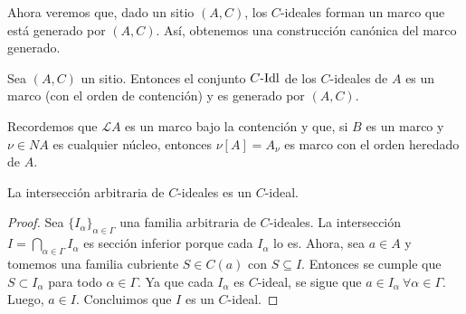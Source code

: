 Ahora veremos que, dado un sitio $(A,C)$, los $C$-ideales forman un
marco que está generado por $(A,C)$. Así, obtenemos una construcción
canónica del marco generado.

\begin{theorem}
    Sea $(A,C)$ un sitio. Entonces el conjunto $C\text{-}\mathrm{Idl}$ de los
    $C$-ideales de $A$ es un marco (con el orden de contención) y es
    generado por $(A,C)$.
\end{theorem}

Recordemos que $\mathcal{L}A$ es un marco bajo la contención
y que, si $B$ es un marco y $\nu\in NA$ es cualquier núcleo,
entonces $\nu[A]=A_\nu$ es marco con el orden heredado de $A$.

\begin{lemma}[Previo]
    La intersección arbitraria de $C$-ideales es un $C$-ideal.
\end{lemma}
\begin{proof}
    Sea $\{I_\alpha\}_{\alpha\in\Gamma}$ una familia arbitraria de
    $C$-ideales. La intersección $I=\bigcap_{\alpha\in\Gamma}I_\alpha$
    es sección inferior porque cada $I_\alpha$ lo es.
    Ahora, sea $a\in A$ y tomemos una familia cubriente $S\in C(a)$
    con $S\subseteq I$. Entonces se cumple que $S\subset I_\alpha$
    para todo $\alpha\in\Gamma$. Ya que cada $I_\alpha$ es $C$-ideal,
    se sigue que $a\in I_\alpha\ \forall\alpha\in\Gamma$. Luego, $a\in I$.
    Concluimos que $I$ es un $C$-ideal.
\end{proof}

